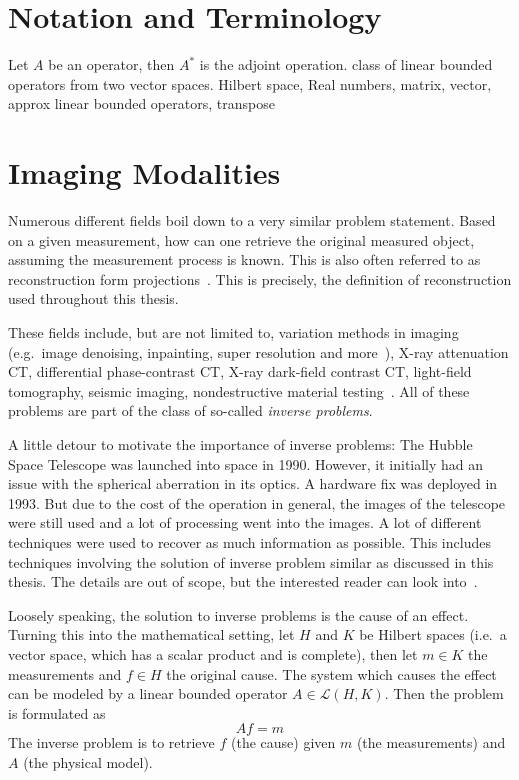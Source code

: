 \chapter{Notation and Terminology}\label{chap:notation}

Let \(A\) be an operator, then \(A^\ast\) is the adjoint operation. class of linear bounded
operators from two vector spaces.
Hilbert space, Real numbers, matrix, vector, approx linear bounded operators, transpose

\chapter{Imaging Modalities}\label{chap:imaging_modalities}

Numerous different fields boil down to a very similar problem statement. Based on a given
measurement, how can one retrieve the original measured object, assuming the measurement process is
known. This is also often referred to as reconstruction form projections~\cite{herman_basis_2015}.
This is precisely, the definition of reconstruction used throughout this thesis.

These fields include, but are not limited to, variation methods in imaging (e.g.\ image denoising,
inpainting, super resolution and more~\cite{scherzer_variational_2009}), X-ray attenuation CT,
differential phase-contrast CT, X-ray dark-field contrast CT, light-field tomography, seismic
imaging, nondestructive material testing~\cite{carpio_inverse_2008}. All of these problems are part
of the class of so-called \textit{inverse problems}.

A little detour to motivate the importance of inverse problems: The Hubble Space Telescope was
launched into space in 1990. However, it initially had an issue with the spherical aberration in
its optics. A hardware fix was deployed in 1993. But due to the cost of the operation in general,
the images of the telescope were still used and a lot of processing went into the images. A lot of
different techniques were used to recover as much information as possible. This includes techniques
involving the solution of inverse problem similar as discussed in this thesis. The details are out
of scope, but the interested reader can look into~\cite{white_restoration_1992,adorf_hubble_1995}.

\begin{definition}\label{def:inverse_problem}
	Loosely speaking, the solution to inverse problems is the cause of an effect. Turning this
	into the mathematical setting, let \(H\) and \(K\) be Hilbert spaces (i.e.\ a vector space,
	which has a scalar product and is complete), then let \(m \in K\) the measurements and \(f
	\in H\) the original cause. The system which causes the effect can be modeled by a
	linear bounded operator \(A \in \mathscr{L}(H, K)\). Then the problem is formulated as
	\[ A f = m \]
	The inverse problem is to retrieve \(f\) (the cause) given \(m\) (the measurements) and \(A\)
	(the physical model).
\end{definition}

